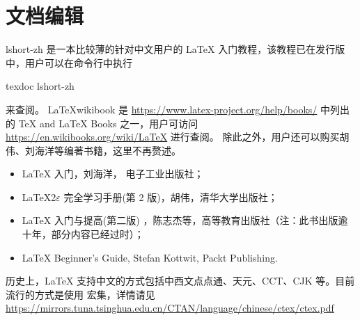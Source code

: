 % 
% 
% 
% 


\section{文档编辑}


lshort-zh 是一本比较薄的针对中文用户的 \LaTeX{} 入门教程，该教程已在发行版中，用户可以在命令行中执行
\begin{shcode}
  texdoc lshort-zh
\end{shcode}
来查阅。 \LaTeX wikibook 是
\url{https://www.latex-project.org/help/books/} 中列出的 \TeX{} and \LaTeX{} Books 之一，用户可访问
\url{https://en.wikibooks.org/wiki/LaTeX} 进行查阅。
除此之外，用户还可以购买胡伟、刘海洋等编著书籍，这里不再赘述。


\begin{itemize}
\item \LaTeX{} 入门，刘海洋， 电子工业出版社；
\item \LaTeX{2$\varepsilon$} 完全学习手册(第 2 版)，胡伟，清华大学出版社；
\item \LaTeX{} 入门与提高(第二版) ，陈志杰等，高等教育出版社（注：此书出版逾十年，部分内容已经过时）；
\item \LaTeX{} Beginner's Guide, Stefan Kottwit, Packt Publishing.
\end{itemize}


历史上，\LaTeX{} 支持中文的方式包括中西文点点通、天元、CCT、CJK 等。目前流行的方式是使用 \CTeX{} 宏集，详情请见
\url{https://mirrors.tuna.tsinghua.edu.cn/CTAN/language/chinese/ctex/ctex.pdf}


